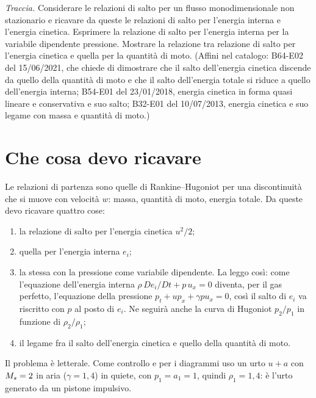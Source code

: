 

\graphicspath{{../../svolgimenti/1975-01-01_E02_salti_energia/figure/}}

\newcommand{\jp}[1]{\left[#1\right]}
\newcommand{\av}[1]{\left\langle #1\right\rangle}
\newcommand{\upa}{u+a}



\maketitle

\emph{Traccia.} Considerare le relazioni di salto per un flusso monodimensionale non stazionario e ricavare da
queste le relazioni di salto per l'energia interna e l'energia cinetica. Esprimere la relazione di salto per
l'energia interna per la variabile dipendente pressione. Mostrare la relazione tra relazione di salto per
l'energia cinetica e quella per la quantità di moto. (Affini nel catalogo: B64-E02 del 15/06/2021, che chiede di
dimostrare che il salto dell'energia cinetica discende da quello della quantità di moto e che il salto dell'energia
totale si riduce a quello dell'energia interna; B54-E01 del 23/01/2018, energia cinetica in forma quasi lineare e
conservativa e suo salto; B32-E01 del 10/07/2013, energia cinetica e suo legame con massa e quantità di moto.)

\section*{Che cosa devo ricavare}
Le relazioni di partenza sono quelle di Rankine--Hugoniot per una discontinuità che si muove con velocità $w$:
massa, quantità di moto, energia totale. Da queste devo ricavare quattro cose:
\begin{enumerate}
  \item la relazione di salto per l'energia cinetica $u^2/2$;
  \item quella per l'energia interna $e_i$;
  \item la stessa con la pressione come variabile dipendente. La leggo così: come l'equazione dell'energia
        interna $\rho\,De_i/Dt+p\,u_x=0$ diventa, per il gas perfetto, l'equazione della pressione
        $p_t+up_x+\gamma pu_x=0$, così il salto di $e_i$ va riscritto con $p$ al posto di $e_i$. Ne seguirà anche la
        curva di Hugoniot $p_2/p_1$ in funzione di $\rho_2/\rho_1$;
  \item il legame fra il salto dell'energia cinetica e quello della quantità di moto.
\end{enumerate}
Il problema è letterale. Come controllo e per i diagrammi uso un urto $\upa$ con $M_{s}=2$ in aria
($\gamma=1{,}4$) in quiete, con $p_1=a_1=1$, quindi $\rho_1=1{,}4$: è l'urto generato da un pistone impulsivo.


